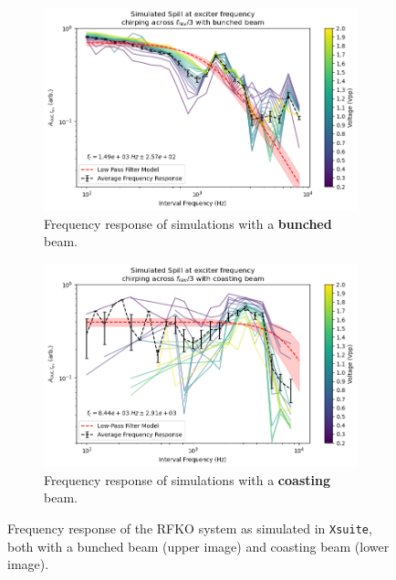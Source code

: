 \documentclass[a4paper,twoside,11pt]{report}
\begin{document}
\begin{figure}[h]
  \centering
  \begin{subfigure}[b]{0.9\linewidth}
    \includegraphics*[width=\linewidth]{sim_rf_on.png}
    \caption{Frequency response of simulations with a \textbf{bunched} beam.}\label{sim_rf_on}
  \end{subfigure}
  \begin{subfigure}[b]{0.9\linewidth}
    \includegraphics*[width=\linewidth]{sim_rf_off.png}
    \caption{Frequency response of simulations with a \textbf{coasting} beam.}\label{sim_rf_off}
  \end{subfigure}
  \cprotect\caption[Simulated RFKO frequency response]{Frequency response of the RFKO system as simulated in \verb|Xsuite|, both with a bunched beam (upper image) and coasting beam (lower image).}\label{fig:freq_response_sim}
\end{figure}
\end{document}
